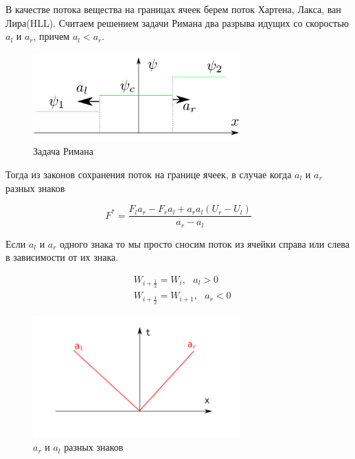 \documentclass[12pt,a4paper]{article}
\begin{document}
В качестве потока вещества на границах ячеек берем поток Хартена, Лакса, ван Лира(HLL). Считаем решением задачи Римана два разрыва идущих со скоростью $a_l$ и $a_r$, причем  $a_l < a_r$. 
\begin{figure}[ht!]
\begin{center}
\includegraphics[width=80mm]{./help/Rieman2.png}
\caption{Задача Римана}
\label{rieman_problem}
\end{center}
\end{figure}

Тогда из законов сохранения поток на границе ячеек, в случае когда  $a_l$ и $a_r$ разных знаков

\begin{equation}
F^* = \frac{F_l a_r - F_r a_l + a_r a_l (U_r - U_l)}{a_r - a_l}
\end{equation}
 
Если $a_l$ и $a_r$ одного знака то мы просто сносим поток из ячейки справа или слева в зависимости от их знака.

\begin{equation}
\begin{aligned}
&W_{i+\frac12} = W_i,\text{  } a_l > 0\\
&W_{i+\frac12} = W_{i+1},\text{  } a_r < 0
\end{aligned}
\end{equation}

\begin{figure}[ht!]
\begin{center}
\includegraphics[width=80mm]{./help/Rieman1.png}
\caption{$a_r$ и $a_l$ разных знаков}
\label{rieman_problem2}
\end{center}
\end{figure}
\end{document}
